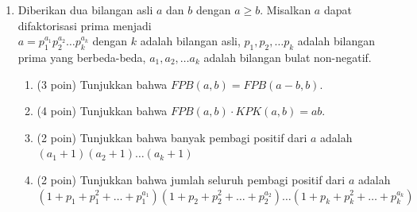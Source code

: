 \documentclass[12pt]{scrartcl}
\begin{document}
\begin{enumerate}[resume]
\begin{enumerate}
		\item (2 poin) Buktikan bahwa $EFBC$ siklis (merupakan segiempat tali busur, dimana keempat titik itu berada pada satu lingkaran).
		
		\item (2 poin) Buktikan bahwa $AFHE$ siklis.
		
		\item (2 poin) Tunjukkan bahwa $HBKC$ merupakan sebuah layang-layang.
		
		\item (2 poin) Tunjukkan bahwa $HBTC$ merupakan sebuah jajar genjang.
		
		\item (2 poin) Tunjukkan bahwa $HD=DK$ dan $HM=MT$.
		
		\item (1 poin) Tunjukkan bahwa $AT$ adalah diameter lingkaran $\Gamma$.
	\end{enumerate}
	
	\item Diberikan dua bilangan asli $a$ dan $b$ dengan $a \ge b$. Misalkan $a$ dapat difaktorisasi prima menjadi\\ $a = p_1^{a_1}p_2^{a_2}\dots p_k^{a_k}$ dengan $k$ adalah bilangan asli, $p_1,p_2,\dots p_k$ adalah bilangan prima yang berbeda-beda, $a_1,a_2,\dots a_k$ adalah bilangan bulat non-negatif.
	\begin{enumerate}
		\item (3 poin) Tunjukkan bahwa $FPB(a,b) = FPB(a-b,b)$.
		\item (4 poin) Tunjukkan bahwa $FPB(a,b) \cdot KPK(a,b) = ab$.
		\item (2 poin) Tunjukkan bahwa banyak pembagi positif dari $a$ adalah $(a_1+1)(a_2+1)\dots(a_k+1)$
		\item (2 poin) Tunjukkan bahwa jumlah seluruh pembagi positif dari $a$ adalah $(1+p_1+p_1^2+\dots+p_1^{a_1})(1+p_2+p_2^2+\dots+p_2^{a_2})\dots (1+p_k+p_k^2+\dots+p_k^{a_k})$
	\end{enumerate}
	
\end{enumerate}
\end{document}
